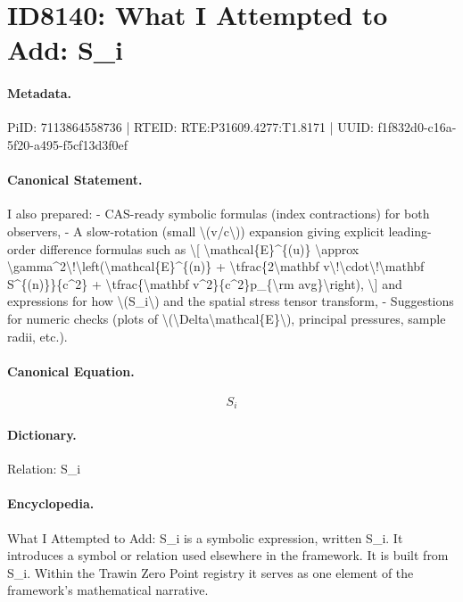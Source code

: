\section*{ID8140: What I Attempted to Add: S\_i}
\paragraph{Metadata.}
PiID: 7113864558736 | RTEID: RTE:P31609.4277:T1.8171 | UUID: f1f832d0-c16a-5f20-a495-f5cf13d3f0ef

\paragraph{Canonical Statement.}
I also prepared: - CAS-ready symbolic formulas (index contractions) for both observers, - A slow-rotation (small \textbackslash{}(v/c\textbackslash{})) expansion giving explicit leading-order difference formulas such as \textbackslash{}[ \textbackslash{}mathcal\{E\}\textasciicircum{}\{(u)\} \textbackslash{}approx \textbackslash{}gamma\textasciicircum{}2\textbackslash{}!\textbackslash{}left(\textbackslash{}mathcal\{E\}\textasciicircum{}\{(n)\} + \textbackslash{}tfrac\{2\textbackslash{}mathbf v\textbackslash{}!\textbackslash{}cdot\textbackslash{}!\textbackslash{}mathbf S\textasciicircum{}\{(n)\}\}\{c\textasciicircum{}2\} + \textbackslash{}tfrac\{\textbackslash{}mathbf v\textasciicircum{}2\}\{c\textasciicircum{}2\}p\_\{\textbackslash{}rm avg\}\textbackslash{}right), \textbackslash{}] and expressions for how \textbackslash{}(S\_i\textbackslash{}) and the spatial stress tensor transform, - Suggestions for numeric checks (plots of \textbackslash{}(\textbackslash{}Delta\textbackslash{}mathcal\{E\}\textbackslash{}), principal pressures, sample radii, etc.).

\paragraph{Canonical Equation.}
\[
S_i
\]

\paragraph{Dictionary.}
Relation: S\_i

\paragraph{Encyclopedia.}
What I Attempted to Add: S\_i is a symbolic expression, written S\_i. It introduces a symbol or relation used elsewhere in the framework. It is built from S\_i. Within the Trawin Zero Point registry it serves as one element of the framework's mathematical narrative.

